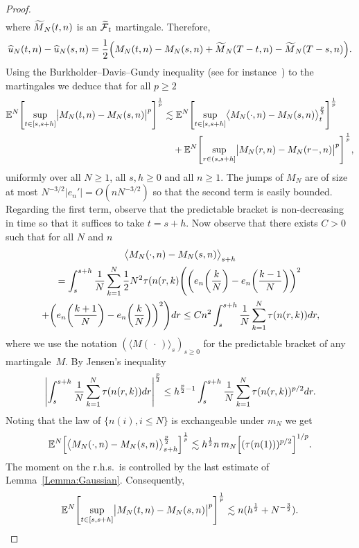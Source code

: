 \documentclass[10pt]{amsart}
\theoremstyle{definition}\newtheorem{defi}[theo]{Definition}\newtheorem{rema}[theo]{Remark}\newtheorem{exam}[theo]{Example}\newtheorem{exem}[theo]{Example}\newtheorem{nota}[theo]{Notation}
\theoremstyle{plain}
\newcommand{\bbE}{\mathbb{E}}
\newcommand{\cF}{\mathcal{F}}
\let\oldtilde\tilde
\renewcommand*{\tilde}[1]{\mathchoice{\widetilde{#1}}{\widetilde{#1}}{\oldtilde{#1}}{\oldtilde{#1}}}
\let\oldhat\hat
\renewcommand*{\hat}[1]{\mathchoice{\widehat{#1}}{\widehat{#1}}{\oldhat{#1}}{\oldhat{#1}}}
\let\originalleft\left
\let\originalright\right
\renewcommand{\left}{\mathopen{}\mathclose\bgroup\originalleft}
\renewcommand{\right}{\aftergroup\egroup\originalright}
\begin{document}
\begin{proof}
\begin{multline}
\end{multline}
where $\tilde{M}_N(t,n)$ is an $\tilde{\cF}_t$ martingale. Therefore,
\begin{equation}
\hat{u}_N(t,n)-\hat{u}_N(s,n) =\frac12\Big(M_N(t,n) - M_N(s,n) + \tilde{M}_N(T-t,n) -\tilde{M}_N(T-s,n) \Big).
\end{equation}
Using the Burkholder--Davis--Gundy inequality (see for instance~\cite{BDG}) to the martingales we deduce that for all $p\geq 2$
\begin{align*}
\bbE^N \left[\sup_{t\in [s,s+h]}\bigl|M_N(t,n) - M_N(s,n)\bigr|^p\right]^{\frac{1}{p}} &\lesssim \bbE^N \left[\sup_{t\in [s,s+h]} \bigl\langle M_N(\cdot,n) - M_N(s,n)\bigr\rangle_t^{\frac{p}{2}}\right]^{\frac{1}{p}}\\
&\quad+ \bbE^N\left[\sup_{r\in(s,s+h]} \bigl|M_N(r,n)-M_N(r-,n)\bigr|^p\right]^{\frac{1}{p}},
\end{align*}
uniformly over all $N\geq 1$, all $s,h \ge 0$ and all $n\geq 1$. The jumps of $M_N$ are of size at most $N^{-3/2} | e_n' |=O(n N^{-3/2})$ so that the second term is easily bounded. Regarding the first term, observe that the predictable bracket is non-decreasing in time so that it suffices to take $t=s+h$. Now observe that there exists $C>0$ such that for all $N$ and $n$
\begin{multline*}
\bigl\langle M_N(\cdot,n) - M_N(s,n)\bigr\rangle_{s+h} \\
= \int_s^{s+h} \frac1{N} \sum_{k=1}^N \frac12 N^2 \tau({n(r,k)} \left(\left(e_n\left(\frac{k}{N}\right) - e_n\left(\frac{k-1}{N}\right)\right)^2\right.\\
\left.
+ \left(e_n\left(\frac{k+1}{N}\right) - e_n\left(\frac{k}{N}\right)\right)^2 \right) dr
\le C n^2\int_s^{s+h} \frac1{N} \sum_{k=1}^N\tau({n(r,k)}) dr,
\end{multline*}
where we use the notation $(\langle M(\,\cdot\,) \rangle_{s})_{s\ge 0}$ for the predictable bracket of any martingale~$M$. By Jensen's inequality
\[
\left| \int_s^{s+h} \frac1{N} \sum_{k=1}^N\tau({n(r,k)}) dr \right|^{\frac{p}{2}} \le h^{\frac{p}{2}-1} \int_s^{s+h} \frac1{N} \sum_{k=1}^N\tau({n(r,k)})^{p/2} dr.
\]
Noting that the law of $\{n(i), i\le N\}$ is exchangeable under $m_N$ we get
\[
\bbE^N \left[\bigl\langle M_N(\cdot,n) - M_N(s,n)\bigr\rangle_{s+h}^{\frac{p}{2}}\right]^{\frac{1}{p}} \lesssim h^{\frac12} n\,m_N\left[(\tau({n(1)}))^{p/2}\right]^{1/p}.
\]
The moment on the r.h.s.~is controlled by the last estimate of Lemma~\ref{Lemma:Gaussian}. Consequently,
\[
\bbE^N \left[\sup_{t\in [s,s+h]}\bigl|M_N(t,n) - M_N(s,n)\bigr|^p\right]^{\frac{1}{p}} \lesssim n(h^{\frac{1}{2}} + N^{-\frac{3}{2}}).
\]
\end{proof}
\end{document}
